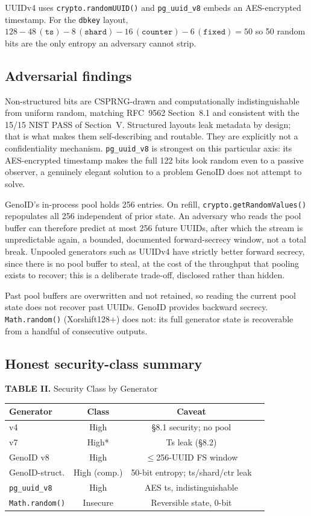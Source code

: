 \documentclass[conference]{IEEEtran}
\begin{document}
\indent UUIDv4 uses \texttt{crypto.randomUUID()} and \texttt{pg\_uuid\_v8} embeds an AES-encrypted timestamp. For the \texttt{dbkey} layout,
$128 - 48\,(\texttt{ts}) - 8\,(\texttt{shard}) - 16\,(\texttt{counter}) - 6\,(\texttt{fixed}) = 50$
so 50 random bits are the only entropy an adversary cannot strip.
\subsection{Adversarial findings}
Non-structured bits are CSPRNG-drawn and computationally indistinguishable from uniform random, matching RFC~9562 Section~8.1 and consistent with the 15/15 NIST PASS of Section~V. Structured layouts leak metadata by design; that is what makes them self-describing and routable. They are explicitly not a confidentiality mechanism. \texttt{pg\_uuid\_v8} is strongest on this particular axis: its AES-encrypted timestamp makes the full 122 bits look random even to a passive observer, a genuinely elegant solution to a problem GenoID does not attempt to solve.

GenoID's in-process pool holds 256 entries. On refill, \texttt{crypto.getRandomValues()} repopulates all 256 independent of prior state. An adversary who reads the pool buffer can therefore predict at most 256 future UUIDs, after which the stream is unpredictable again, a bounded, documented forward-secrecy window, not a total break. Unpooled generators such as UUIDv4 have strictly better forward secrecy, since there is no pool buffer to steal, at the cost of the throughput that pooling exists to recover; this is a deliberate trade-off, disclosed rather than hidden.

Past pool buffers are overwritten and not retained, so reading the current pool state does not recover past UUIDs. GenoID provides backward secrecy. \texttt{Math.random()} (Xorshift128+) does not: its full generator state is recoverable from a handful of consecutive outputs.
\subsection{Honest security-class summary}
\begin{center}
\scriptsize
\textbf{TABLE II.} Security Class by Generator

\vspace{0.3em}

\begin{tabular*}{\columnwidth}{@{\extracolsep{\fill}}lccc}
\hline
\textbf{Generator} & \textbf{Class} & \textbf{Caveat} \\
\hline
v4 & High & §8.1 security; no pool \\
v7 & High* & Ts leak (§8.2) \\
GenoID v8 & High & $\leq$256-UUID FS window \\
GenoID-struct. & High (comp.) & 50-bit entropy; ts/shard/ctr leak \\
\texttt{pg\_uuid\_v8} & High & AES ts, indistinguishable \\
\texttt{Math.random()} & Insecure & Reversible state, 0-bit \\
\hline
\end{tabular*}
\end{center}
\end{document}
